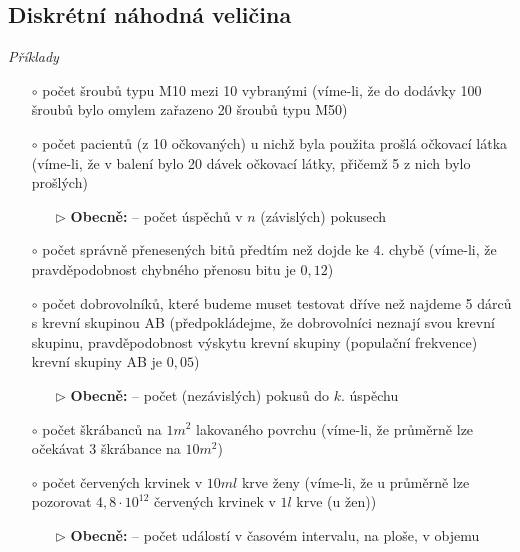 \subsection{Diskrétní náhodná veličina}
\textit{Příklady}
\begin{itemize}
	\item[$\circ$] počet šroubů typu M10 mezi 10 vybranými (víme-li, že do dodávky 100 šroubů bylo omylem zařazeno 20 šroubů typu M50)
	\item[$\circ$] počet pacientů (z 10 očkovaných) u nichž byla použita prošlá očkovací látka (víme-li, že v balení bylo 20 dávek očkovací látky, přičemž 5 z nich bylo prošlých)

\begin{itemize}
	\item[$\rhd$] \textbf{Obecně:} -- počet úspěchů v $n$ (závislých) pokusech
	\end{itemize}
	\item[$\circ$] počet správně přenesených bitů předtím než dojde ke $4.$ chybě (víme-li, že pravděpodobnost chybného přenosu bitu je $0,12$)
	\item[$\circ$] počet dobrovolníků, které budeme muset testovat dříve než najdeme 5 dárců s krevní skupinou AB (předpokládejme, že dobrovolníci neznají svou krevní skupinu, pravděpodobnost výskytu krevní skupiny (populační frekvence) krevní skupiny AB je $0,05$)
\begin{itemize}
	\item[$\rhd$] \textbf{Obecně:} -- počet (nezávislých) pokusů do $k.$ úspěchu
	\end{itemize}
	\item[$\circ$] počet škrábanců na $1 m^2$ lakovaného povrchu (víme-li, že průměrně lze očekávat 3 škrábance na $10 m^2$)
	\item[$\circ$] počet červených krvinek v $10 ml$ krve ženy (víme-li, že u průměrně lze pozorovat $4,8 \cdot 10^{12}$ červených krvinek v $1l$ krve (u žen))
\begin{itemize}
	\item[$\rhd$] \textbf{Obecně:} -- počet událostí v časovém intervalu, na ploše, v objemu
	\end{itemize}
\end{itemize}
